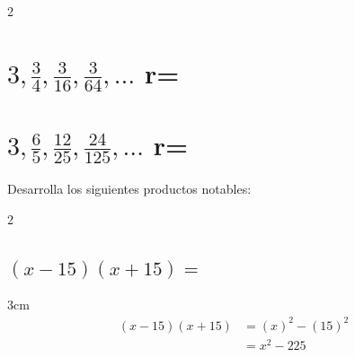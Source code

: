 \documentclass[12pt,addpoints,answers]{evalua}
\begin{document}
\begin{questions}
\begin{multicols}{2}
\begin{parts}
            \part {\Large $3,\frac{3}{4}, \frac{3}{16}, \frac{3}{64},\dots$ \quad r=\fillin[$\frac{1}{4}$][0cm]}

            \part {\Large $3,\frac{6}{5}, \frac{12}{25}, \frac{24}{125},\dots$ \quad r=\fillin[$\frac{2}{5}$][0cm]}

        \end{parts}

    \end{multicols}

    \newpage
    \question[10] Desarrolla los siguientes productos notables:
    \begin{multicols}{2}
        \begin{parts}
            \part {\Large $(x-15)(x+15)=$}

            \begin{solutionbox}{3cm}
                \begin{align*}
                    (x-15)(x+15) & = (x)^2-(15)^2 \\
                                 & = x^2-225
                \end{align*}
            \end{solutionbox}






\end{parts}
\end{multicols}
\end{questions}
\end{document}
